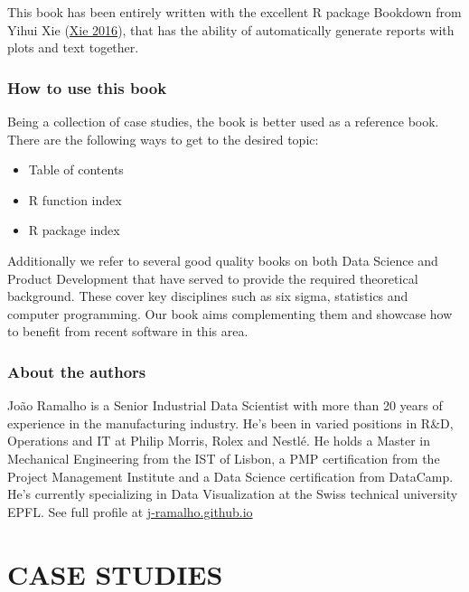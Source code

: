 \documentclass[
]{book}
\providecommand{\tightlist}{%
  \setlength{\itemsep}{0pt}\setlength{\parskip}{0pt}}
\begin{document}
This book has been entirely written with the excellent R package Bookdown from Yihui Xie (\protect\hyperlink{ref-Xie2016}{Xie 2016}), that has the ability of automatically generate reports with plots and text together.

\hypertarget{how-to-use-this-book}{%
\section{How to use this book}\label{how-to-use-this-book}}

Being a collection of case studies, the book is better used as a reference book. There are the following ways to get to the desired topic:

\begin{itemize}
\tightlist
\item
  Table of contents
\item
  R function index
\item
  R package index
\end{itemize}

Additionally we refer to several good quality books on both Data Science and Product Development that have served to provide the required theoretical background. These cover key disciplines such as six sigma, statistics and computer programming. Our book aims complementing them and showcase how to benefit from recent software in this area.

\hypertarget{about-the-authors}{%
\section{About the authors}\label{about-the-authors}}

João Ramalho is a Senior Industrial Data Scientist with more than 20 years of experience in the manufacturing industry. He's been in varied positions in R\&D, Operations and IT at Philip Morris, Rolex and Nestlé. He holds a Master in Mechanical Engineering from the IST of Lisbon, a PMP certification from the Project Management Institute and a Data Science certification from DataCamp. He's currently specializing in Data Visualization at the Swiss technical university EPFL. See full profile at \href{https://j-ramalho.github.io/}{j-ramalho.github.io}

\hypertarget{part-case-studies}{%
\part{CASE STUDIES}\label{part-case-studies}}
\end{document}
